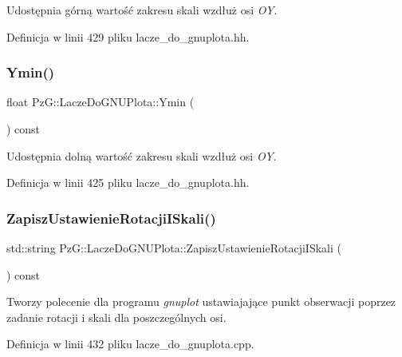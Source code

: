 Udostępnia górną wartość zakresu skali wzdłuż osi {\itshape OY}. 

Definicja w linii 429 pliku lacze\+\_\+do\+\_\+gnuplota.\+hh.

\mbox{\label{class_pz_g_1_1_lacze_do_g_n_u_plota_a9352c0382bfaeaaba9f65399a7383164}} 
\subsubsection{\texorpdfstring{Ymin()}{Ymin()}}
{\footnotesize\ttfamily float Pz\+G\+::\+Lacze\+Do\+G\+N\+U\+Plota\+::\+Ymin (\begin{DoxyParamCaption}{ }\end{DoxyParamCaption}) const\hspace{0.3cm}{\ttfamily [inline]}}

Udostępnia dolną wartość zakresu skali wzdłuż osi {\itshape OY}. 

Definicja w linii 425 pliku lacze\+\_\+do\+\_\+gnuplota.\+hh.

\mbox{\label{class_pz_g_1_1_lacze_do_g_n_u_plota_aa92b463e8cbae31b50dd797a4183bce8}} 
\subsubsection{\texorpdfstring{ZapiszUstawienieRotacjiISkali()}{ZapiszUstawienieRotacjiISkali()}}
{\footnotesize\ttfamily std\+::string Pz\+G\+::\+Lacze\+Do\+G\+N\+U\+Plota\+::\+Zapisz\+Ustawienie\+Rotacji\+I\+Skali (\begin{DoxyParamCaption}{ }\end{DoxyParamCaption}) const\hspace{0.3cm}{\ttfamily [protected]}}

Tworzy polecenie dla programu {\itshape gnuplot} ustawiajające punkt obserwacji poprzez zadanie rotacji i skali dla poszczególnych osi. 

Definicja w linii 432 pliku lacze\+\_\+do\+\_\+gnuplota.\+cpp.

\mbox{\label{class_pz_g_1_1_lacze_do_g_n_u_plota_a4579aecf7b4777fdde0cae4e98c275c2}} 

